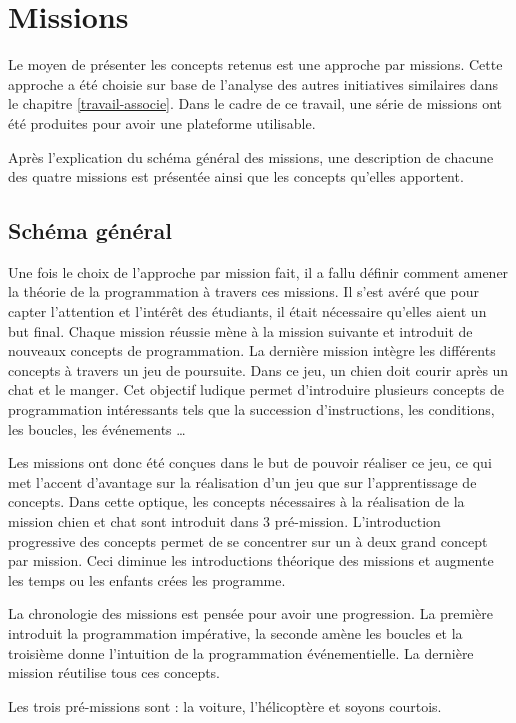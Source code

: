 \section{Missions}
\label{missions}
Le moyen de présenter les concepts retenus est une approche par missions. Cette approche a été choisie sur base de l'analyse des autres initiatives similaires dans le chapitre \ref{travail-associe}. Dans le cadre de ce travail, une série de missions ont été produites pour avoir une plateforme utilisable.

Après l'explication du schéma général des missions, une description de chacune des quatre missions est présentée ainsi que les concepts qu'elles apportent.

\subsection{Schéma général}
Une fois le choix de l'approche par mission fait, il a fallu définir comment amener la théorie de la programmation à travers ces missions. Il s'est avéré que pour capter l'attention et l'intérêt des étudiants, il était nécessaire qu'elles aient un but final. Chaque mission réussie mène à la mission suivante et introduit de nouveaux concepts de programmation. La dernière mission intègre les différents concepts à travers un jeu de poursuite. Dans ce jeu, un chien doit courir après un chat et le manger. Cet objectif ludique permet d'introduire plusieurs concepts de programmation intéressants tels que la succession d'instructions, les conditions, les boucles, les événements \ldots

Les missions ont donc été conçues dans le but de pouvoir réaliser ce jeu, ce qui met l'accent d'avantage sur la réalisation d'un jeu que sur l'apprentissage de concepts. Dans cette optique, les concepts nécessaires à la réalisation de la mission chien et chat sont introduit dans 3 pré-mission. L'introduction progressive des concepts permet de se concentrer sur un à deux grand concept par mission. Ceci diminue les introductions théorique des missions et augmente les temps ou les enfants crées les programme.

La chronologie des missions est pensée pour avoir une progression. La première introduit la programmation impérative, la seconde amène les boucles et la troisième donne l'intuition de la programmation événementielle. La dernière mission réutilise tous ces concepts.

Les trois pré-missions sont : la voiture, l'hélicoptère et soyons courtois.


